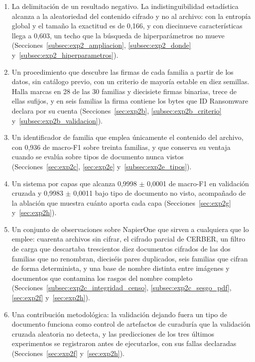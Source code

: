 \begin{enumerate}
\item La delimitación de un resultado negativo. La indistinguibilidad estadística alcanza a la aleatoriedad del contenido cifrado y no al archivo: con la entropía global y el tamaño la exactitud es de 0,166, y con diecinueve características llega a 0,603, un techo que la búsqueda de hiperparámetros no mueve (Secciones~\ref{subsec:exp2_ampliacion}, \ref{subsec:exp2_donde} y~\ref{subsec:exp2_hiperparametros}).
\item Un procedimiento que descubre las firmas de cada familia a partir de los datos, sin catálogo previo, con un criterio de mayoría estable en diez semillas. Halla marcas en 28 de las 30 familias y diecisiete firmas binarias, trece de ellas sufijos, y en seis familias la firma contiene los bytes que ID Ransomware declara por su cuenta (Secciones~\ref{sec:exp2b}, \ref{subsec:exp2b_criterio} y~\ref{subsec:exp2b_validacion}).
\item Un identificador de familia que emplea únicamente el contenido del archivo, con 0,936 de macro-F1 sobre treinta familias, y que conserva su ventaja cuando se evalúa sobre tipos de documento nunca vistos (Secciones~\ref{sec:exp2c}, \ref{sec:exp2e} y~\ref{subsec:exp2e_tipos}).
\item Un sistema por capas que alcanza 0,9998 $\pm$ 0,0001 de macro-F1 en validación cruzada y 0,9983 $\pm$ 0,0011 bajo tipo de documento no visto, acompañado de la ablación que muestra cuánto aporta cada capa (Secciones~\ref{sec:exp2g} y~\ref{sec:exp2h}).
\item Un conjunto de observaciones sobre NapierOne que sirven a cualquiera que lo emplee: cuarenta archivos sin cifrar, el cifrado parcial de CERBER, un filtro de carga que descartaba trescientos diez documentos cifrados de las dos familias que no renombran, dieciséis pares duplicados, seis familias que cifran de forma determinista, y una base de nombre distinta entre imágenes y documentos que contamina los rasgos del nombre completo (Secciones~\ref{subsec:exp2c_integridad_censo}, \ref{subsec:exp2c_sesgo_pdf}, \ref{sec:exp2f} y~\ref{sec:exp2h}).
\item Una contribución metodológica: la validación dejando fuera un tipo de documento funciona como control de artefactos de curaduría que la validación cruzada aleatoria no detecta, y las predicciones de los tres últimos experimentos se registraron antes de ejecutarlos, con sus fallas declaradas (Secciones~\ref{sec:exp2f} y~\ref{sec:exp2h}).
\end{enumerate}

